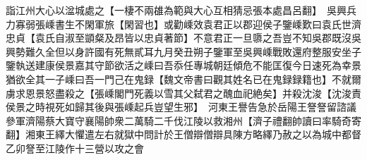 詣江州大心以湓城處之【一棲不兩䧺為範與大心互相猜忌張本處昌呂翻】　吳興兵力寡弱張嵊書生不閑軍旅【閑習也】或勸嵊效袁君正以郡迎侯子鑒嵊歎曰袁氏世濟忠貞【袁氏自淑至顗粲及昂皆以忠貞著節】不意君正一旦隳之吾豈不知吳郡既沒吳興勢難久全但以身許國有死無貳耳九月癸丑朔子鑒軍至吳興嵊戰敗還府整服安坐子鑒執送建康侯景嘉其守節欲活之嵊曰吾忝任專城朝廷傾危不能匡復今日速死為幸景猶欲全其一子嵊曰吾一門己在鬼録【魏文帝書曰觀其姓名已在鬼録録籍也】不就爾虜求恩景怒盡殺之【張嵊閣門死義以雪其父弑君之醜血祀絶矣】并殺沈浚【沈浚責侯景之時視死如歸其後與張嵊起兵豈望生邪】　河東王譽告急於岳陽王詧詧留諮議參軍濟陽蔡大寶守襄陽帥衆二萬騎二千伐江陵以救湘州【濟子禮翻帥讀曰率騎奇寄翻】湘東王繹大懼遣左右就獄中問計於王僧辯僧辯具陳方略繹乃赦之以為城中都督乙卯詧至江陵作十三營以攻之會